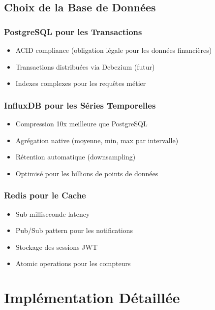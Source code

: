 \documentclass[12pt,a4paper,twoside]{report}
\begin{document}
\section{Choix de la Base de Données}

\subsection{PostgreSQL pour les Transactions}
\begin{itemize}
    \item ACID compliance (obligation légale pour les données financières)
    \item Transactions distribuées via Debezium (futur)
    \item Indexes complexes pour les requêtes métier
\end{itemize}

\subsection{InfluxDB pour les Séries Temporelles}
\begin{itemize}
    \item Compression 10x meilleure que PostgreSQL
    \item Agrégation native (moyenne, min, max par intervalle)
    \item Rétention automatique (downsampling)
    \item Optimisé pour les billions de points de données
\end{itemize}

\subsection{Redis pour le Cache}
\begin{itemize}
    \item Sub-milliseconde latency
    \item Pub/Sub pattern pour les notifications
    \item Stockage des sessions JWT
    \item Atomic operations pour les compteurs
\end{itemize}

\chapter{Implémentation Détaillée}
\end{document}
